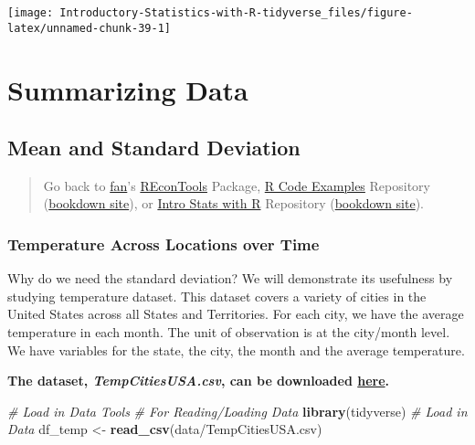 \documentclass[
]{book}
\newenvironment{Shaded}{\begin{snugshade}}{\end{snugshade}}
\newcommand{\CommentTok}[1]{\textcolor[rgb]{0.56,0.35,0.01}{\textit{#1}}}
\newcommand{\KeywordTok}[1]{\textcolor[rgb]{0.13,0.29,0.53}{\textbf{#1}}}
\newcommand{\NormalTok}[1]{#1}
\newcommand{\StringTok}[1]{\textcolor[rgb]{0.31,0.60,0.02}{#1}}
\begin{document}
\begin{center}\texttt{[image: Introductory-Statistics-with-R-tidyverse\_files/figure-latex/unnamed-chunk-39-1]} \end{center}

\hypertarget{summarizing-data}{%
\chapter{Summarizing Data}\label{summarizing-data}}

\hypertarget{mean-and-standard-deviation}{%
\section{Mean and Standard Deviation}\label{mean-and-standard-deviation}}

\begin{quote}
Go back to \href{http://fanwangecon.github.io/}{fan}'s \href{https://fanwangecon.github.io/REconTools/}{REconTools} Package, \href{https://fanwangecon.github.io/R4Econ/}{R Code Examples} Repository (\href{https://fanwangecon.github.io/R4Econ/bookdown}{bookdown site}), or \href{https://fanwangecon.github.io/Stat4Econ/}{Intro Stats with R} Repository (\href{https://fanwangecon.github.io/Stat4Econ/bookdown}{bookdown site}).
\end{quote}

\hypertarget{temperature-across-locations-over-time}{%
\subsection{Temperature Across Locations over Time}\label{temperature-across-locations-over-time}}

Why do we need the standard deviation? We will demonstrate its usefulness by studying temperature dataset. This dataset covers a variety of cities in the United States across all States and Territories. For each city, we have the average temperature in each month. The unit of observation is at the city/month level. We have variables for the state, the city, the month and the average temperature.

\textbf{The dataset, \emph{TempCitiesUSA.csv}, can be downloaded \href{https://github.com/FanWangEcon/Stat4Econ/tree/master/data/TempCitiesUSA.csv}{here}.}

\begin{Shaded}
\begin{Highlighting}[]
\CommentTok{\# Load in Data Tools}
\CommentTok{\# For Reading/Loading Data}
\KeywordTok{library}\NormalTok{(tidyverse)}
\CommentTok{\# Load in Data}
\NormalTok{df\_temp \textless{}{-}}\StringTok{ }\KeywordTok{read\_csv}\NormalTok{(}\StringTok{\textquotesingle{}data/TempCitiesUSA.csv\textquotesingle{}}\NormalTok{)}
\end{Highlighting}
\end{Shaded}
\end{document}
